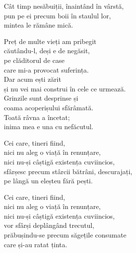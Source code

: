 Cât timp nesăbuiții, înaintând în vârstă,\\
pun pe ei precum boii în staulul lor,\\
mintea le rămâne mică.


Preț de multe vieți am pribegit\\
căutându-l, deși e de negăsit,\\
pe clăditorul de case\\
care mi-a provocat suferința.\\
Dar acum ești zărit\\
și nu vei mai construi în cele ce urmează.\\
Grinzile sunt desprinse și\\
coama acoperișului sfărâmată.\\
Toată râvna a încetat;\\
inima mea e una cu nefăcutul.


Cei care, tineri fiind,\\
nici nu aleg o viață în renunțare,\\
nici nu-și câștigă existența cuviincios,\\
sfârșesc precum stârcii bătrâni, descurajați,\\
pe lângă un eleșteu fără pești.


Cei care, tineri fiind,\\
nici nu aleg o viață în renunțare,\\
nici nu-și câștigă existența cuviincios,\\
vor sfârși deplângând trecutul,\\
prăbușindu-se precum săgețile consumate\\
care și-au ratat ținta.
